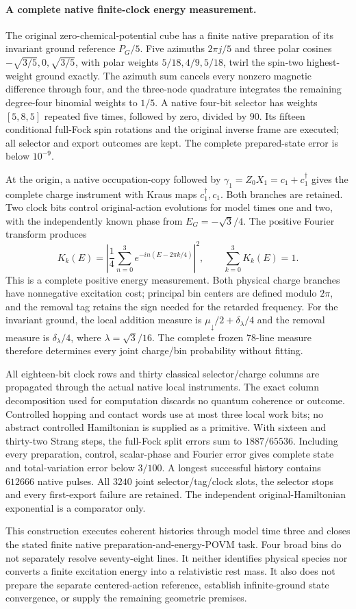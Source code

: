 \paragraph{A complete native finite-clock energy measurement.}
The original zero-chemical-potential cube has a finite native
preparation of its invariant ground reference $P_G/5$.
Five azimuths $2\pi j/5$ and three polar cosines
$-\sqrt{3/5},0,\sqrt{3/5}$, with polar weights
$5/18,4/9,5/18$, twirl the spin-two highest-weight ground exactly.
The azimuth sum cancels every nonzero magnetic difference through four,
and the three-node quadrature integrates the remaining degree-four
binomial weights to $1/5$. A native four-bit selector has weights
$[5,8,5]$ repeated five times, followed by zero, divided by $90$.
Its fifteen conditional full-Fock spin rotations and the original
inverse frame are executed; all selector and export outcomes are kept.
The complete prepared-state error is below $10^{-9}$.

At the origin, a native occupation-copy followed by
$\gamma_1=Z_0X_1=c_1+c_1^\dagger$ gives the complete charge instrument
with Kraus maps $c_1^\dagger,c_1$. Both branches are retained.
Two clock bits control original-action evolutions for model times one
and two, with the independently known phase from
$E_G=-\sqrt3/4$. The positive Fourier transform produces
\[
 K_k(E)=\left|\frac14\sum_{n=0}^{3}
       e^{-in(E-2\pi k/4)}\right|^2,
 \qquad \sum_{k=0}^{3}K_k(E)=1.
\]
This is a complete positive energy measurement. Both physical charge
branches have nonnegative excitation cost; principal bin centers are
defined modulo $2\pi$, and the removal tag retains the sign needed for
the retarded frequency. For the invariant ground, the local addition
measure is $\mu_\downarrow/2+\delta_\lambda/4$ and the removal measure
is $\delta_\lambda/4$, where $\lambda=\sqrt3/16$.
The complete frozen 78-line measure therefore determines every joint
charge/bin probability without fitting.

All eighteen-bit clock rows and thirty classical selector/charge
columns are propagated through the actual native local instruments.
The exact column decomposition used for computation discards no
quantum coherence or outcome. Controlled hopping and contact words
use at most three local work bits; no abstract controlled Hamiltonian
is supplied as a primitive. With sixteen and thirty-two Strang steps,
the full-Fock split errors sum to $1887/65536$. Including every
preparation, control, scalar-phase and Fourier error gives complete
state and total-variation error below $3/100$.
A longest successful history contains $612666$ native pulses.
All $3240$ joint selector/tag/clock slots, the selector stops and every
first-export failure are retained. The independent original-Hamiltonian
exponential is a comparator only.

This construction executes coherent histories through model time three
and closes the stated finite native preparation-and-energy-POVM task.
Four broad bins do not separately resolve seventy-eight lines.
It neither identifies physical species nor converts a finite excitation
energy into a relativistic rest mass. It also does not prepare the
separate centered-action reference, establish infinite-ground state
convergence, or supply the remaining geometric premises.
